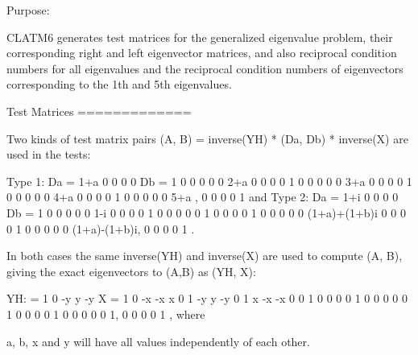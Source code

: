 \begin{DoxyParagraph}{Purpose\+: }
\begin{DoxyVerb} CLATM6 generates test matrices for the generalized eigenvalue
 problem, their corresponding right and left eigenvector matrices,
 and also reciprocal condition numbers for all eigenvalues and
 the reciprocal condition numbers of eigenvectors corresponding to
 the 1th and 5th eigenvalues.

 Test Matrices
 =============

 Two kinds of test matrix pairs
          (A, B) = inverse(YH) * (Da, Db) * inverse(X)
 are used in the tests:

 Type 1:
    Da = 1+a   0    0    0    0    Db = 1   0   0   0   0
          0   2+a   0    0    0         0   1   0   0   0
          0    0   3+a   0    0         0   0   1   0   0
          0    0    0   4+a   0         0   0   0   1   0
          0    0    0    0   5+a ,      0   0   0   0   1
 and Type 2:
    Da = 1+i   0    0       0       0    Db = 1   0   0   0   0
          0   1-i   0       0       0         0   1   0   0   0
          0    0    1       0       0         0   0   1   0   0
          0    0    0 (1+a)+(1+b)i  0         0   0   0   1   0
          0    0    0       0 (1+a)-(1+b)i,   0   0   0   0   1 .

 In both cases the same inverse(YH) and inverse(X) are used to compute
 (A, B), giving the exact eigenvectors to (A,B) as (YH, X):

 YH:  =  1    0   -y    y   -y    X =  1   0  -x  -x   x
         0    1   -y    y   -y         0   1   x  -x  -x
         0    0    1    0    0         0   0   1   0   0
         0    0    0    1    0         0   0   0   1   0
         0    0    0    0    1,        0   0   0   0   1 , where

 a, b, x and y will have all values independently of each other.\end{DoxyVerb}
 
\end{DoxyParagraph}

